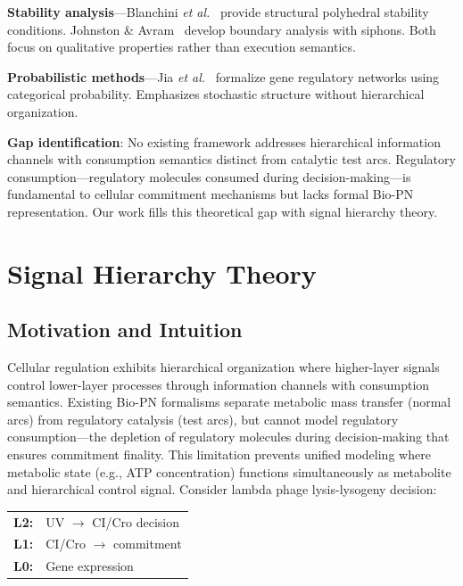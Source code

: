 \documentclass[twocolumn,11pt]{article}
\newcommand{\etal}{\textit{et al.}}  %
\begin{document}
\noindent\textbf{Stability analysis}---Blanchini \etal~\cite{blanchini2021} provide structural polyhedral stability conditions. Johnston \& Avram~\cite{johnston2025} develop boundary analysis with siphons. Both focus on qualitative properties rather than execution semantics.

\noindent\textbf{Probabilistic methods}---Jia \etal~\cite{jia2025} formalize gene regulatory networks using categorical probability. Emphasizes stochastic structure without hierarchical organization.

\noindent\textbf{Gap identification}: No existing framework addresses hierarchical information channels with consumption semantics distinct from catalytic test arcs. Regulatory consumption---regulatory molecules consumed during decision-making---is fundamental to cellular commitment mechanisms but lacks formal Bio-PN representation. Our work fills this theoretical gap with signal hierarchy theory.

\section{Signal Hierarchy Theory}

\subsection{Motivation and Intuition}

Cellular regulation exhibits hierarchical organization where higher-layer signals control lower-layer processes through information channels with consumption semantics. Existing Bio-PN formalisms separate metabolic mass transfer (normal arcs) from regulatory catalysis (test arcs), but cannot model regulatory consumption---the depletion of regulatory molecules during decision-making that ensures commitment finality. This limitation prevents unified modeling where metabolic state (e.g., ATP concentration) functions simultaneously as metabolite and hierarchical control signal. Consider lambda phage lysis-lysogeny decision:

\begin{center}
\small
\begin{tabular}{@{}ll@{}}
\textbf{L2:} & UV $\to$ CI/Cro decision \\
\textbf{L1:} & CI/Cro $\to$ commitment \\
\textbf{L0:} & Gene expression
\end{tabular}
\end{center}
\end{document}
